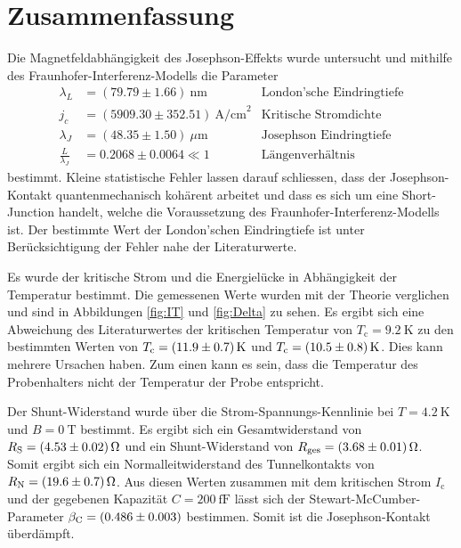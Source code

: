 \section{Zusammenfassung}


Die Magnetfeldabhängigkeit des Josephson-Effekts wurde untersucht und mithilfe des Fraunhofer-Interferenz-Modells die Parameter 
\begin{align}
    \lambda_L &= (79.79 \pm 1.66)\ \text{nm} &\text{London'sche Eindringtiefe}\\
    j_c &=  (5909.30 \pm 352.51)\ \text{A/cm}^2 &\text{Kritische Stromdichte}\\
    \lambda_J &=  (48.35 \pm 1.50)\ \mu\text{m} &\text{Josephson Eindringtiefe}\\
    \frac{L}{\lambda_J} &= 0.2068 \pm 0.0064 \ll 1 &\text{Längenverhältnis}
\end{align}
bestimmt. Kleine statistische Fehler lassen darauf schliessen, dass der Josephson-Kontakt quantenmechanisch kohärent arbeitet und dass es sich um eine Short-Junction handelt, welche die Voraussetzung des Fraunhofer-Interferenz-Modells ist. Der bestimmte Wert der London'schen Eindringtiefe ist unter Berücksichtigung der Fehler nahe der Literaturwerte.

Es wurde der kritische Strom und die Energielücke in Abhängigkeit der Temperatur bestimmt. Die gemessenen Werte wurden mit der Theorie verglichen und sind in Abbildungen \ref{fig:IT} und \ref{fig:Delta} zu sehen. Es ergibt sich eine Abweichung des Literaturwertes der kritischen Temperatur von $T_\mathrm{c} = \SI{9.2}{\kelvin}$ zu den bestimmten Werten von $T_\mathrm{c} = \SI{11.9+-0.7}{\kelvin}$ und $T_\mathrm{c} = \SI{10.5+-0.8}{\kelvin}$. Dies kann mehrere Ursachen haben. Zum einen kann es sein, dass die Temperatur des Probenhalters nicht der Temperatur der Probe entspricht.

Der Shunt-Widerstand wurde über die Strom-Spannungs-Kennlinie bei $T = \SI{4.2}{\kelvin}$ und $B = \SI{0}{\tesla}$ bestimmt. Es ergibt sich ein Gesamtwiderstand von $R_\mathrm{S} = \SI{4.53+-0.02}{\ohm}$ und ein Shunt-Widerstand von $R_\mathrm{ges} = \SI{3.68+-0.01}{\ohm}$. Somit ergibt sich ein Normalleitwiderstand des Tunnelkontakts von $R_\mathrm{N} = \SI{19.6+-0.7}{\ohm}$. Aus diesen Werten zusammen mit dem kritischen Strom $I_\mathrm{c}$ und der gegebenen Kapazität $C = \SI{200}{\femto\farad}$ lässt sich der Stewart-McCumber-Parameter $\beta_\mathrm{C} = \SI{0.486 +- 0.003}{} $ bestimmen. Somit ist die Josephson-Kontakt überdämpft.
